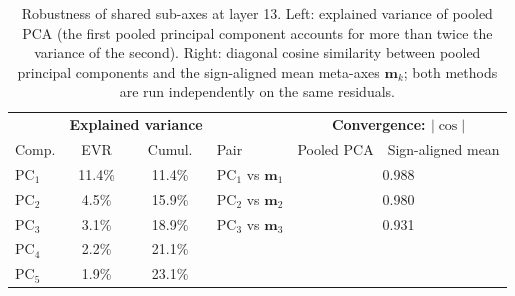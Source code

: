 \begin{table}[ht]
\centering
\caption{Robustness of shared sub-axes at layer 13.
  Left: explained variance of pooled PCA (the first pooled principal component
  accounts for more than twice the variance of the second).
  Right: diagonal cosine similarity between pooled principal components and the
  sign-aligned mean meta-axes $\mathbf{m}_k$; both methods are run
  independently on the same residuals.}
\label{tab:pooled_pca_robustness}
\begin{tabular}{lcc|lcc}
\toprule
& \multicolumn{2}{c|}{\textbf{Explained variance}}
& & \multicolumn{2}{c}{\textbf{Convergence: $|\cos|$}} \\
Comp. & EVR & Cumul. & Pair & Pooled PCA & Sign-aligned mean \\
\midrule
  PC$_1$ & 11.4\% & 11.4\% & PC$_1$ vs $\mathbf{m}_1$ & \multicolumn{2}{c}{0.988} \\
  PC$_2$ & 4.5\% & 15.9\% & PC$_2$ vs $\mathbf{m}_2$ & \multicolumn{2}{c}{0.980} \\
  PC$_3$ & 3.1\% & 18.9\% & PC$_3$ vs $\mathbf{m}_3$ & \multicolumn{2}{c}{0.931} \\
  PC$_4$ & 2.2\% & 21.1\% & & & \\
  PC$_5$ & 1.9\% & 23.1\% & & & \\
\bottomrule
\end{tabular}
\end{table}
